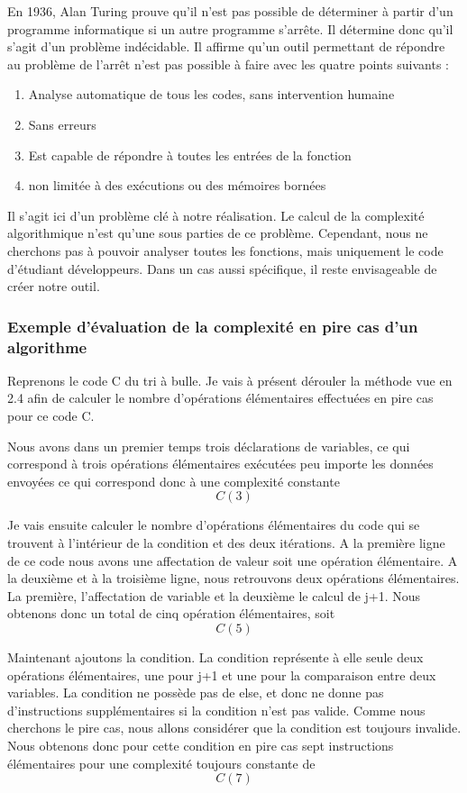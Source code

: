 \documentclass[12pt, twoside, openright]{report}
\begin{document}
En 1936, Alan Turing prouve qu'il n'est pas possible de déterminer à partir d'un programme informatique si un autre programme s'arrête. Il détermine donc qu'il s'agit d'un problème indécidable. Il affirme qu'un outil permettant de répondre au problème de l'arrêt n'est pas possible à faire avec les quatre points suivants : 

\begin{enumerate}
    \item Analyse automatique de tous les codes, sans intervention humaine
    \item Sans erreurs
    \item Est capable de répondre à toutes les entrées de la fonction
    \item non limitée à des exécutions ou des mémoires bornées
\end{enumerate}


Il s'agit ici d'un problème clé à notre réalisation. Le calcul de la complexité algorithmique n'est qu'une sous parties de ce problème. Cependant, nous ne cherchons pas à pouvoir analyser toutes les fonctions, mais uniquement le code d'étudiant développeurs. Dans un cas aussi spécifique, il reste envisageable de créer notre outil.  

\subsubsection{Exemple d'évaluation de la complexité en pire cas d'un algorithme}

Reprenons le code C du tri à bulle. Je vais à présent dérouler la méthode vue en 2.4 afin de calculer le nombre d'opérations élémentaires effectuées en pire cas pour ce code C. 

Nous avons dans un premier temps trois déclarations de variables, ce qui correspond à trois opérations élémentaires exécutées peu importe les données envoyées ce qui correspond donc à une complexité constante \[C(3)\]

Je vais ensuite calculer le nombre d'opérations élémentaires du code qui se trouvent à l'intérieur de la condition et des deux itérations. A la première ligne de ce code nous avons une affectation de valeur soit une opération élémentaire. A la deuxième et à la troisième ligne, nous retrouvons deux opérations élémentaires. La première, l'affectation de variable et la deuxième le calcul de j+1. Nous obtenons donc un total de cinq opération élémentaires, soit \[C(5)\]

Maintenant ajoutons la condition. La condition représente à elle seule deux opérations élémentaires, une pour j+1 et une pour la comparaison entre deux variables. La condition ne possède pas de else, et donc ne donne pas d'instructions supplémentaires si la condition n'est pas valide. Comme nous cherchons le pire cas, nous allons considérer que la condition est toujours invalide. Nous obtenons donc pour cette condition en pire cas sept instructions élémentaires pour une complexité toujours constante de \[C(7)\] 
\end{document}
